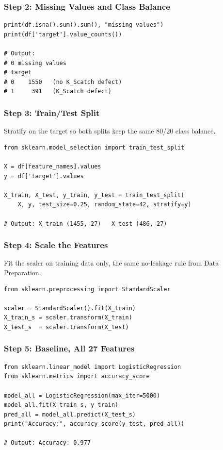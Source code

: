 \begin{frame}[fragile]\frametitle{Step 2: Missing Values and Class Balance}
\begin{lstlisting}
print(df.isna().sum().sum(), "missing values")
print(df['target'].value_counts())

# Output:
# 0 missing values
# target
# 0    1550   (no K_Scatch defect)
# 1     391   (K_Scatch defect)
\end{lstlisting}
\end{frame}

\begin{frame}[fragile]\frametitle{Step 3: Train/Test Split}
Stratify on the target so both splits keep the same 80/20 class balance.
\begin{lstlisting}
from sklearn.model_selection import train_test_split

X = df[feature_names].values
y = df['target'].values

X_train, X_test, y_train, y_test = train_test_split(
    X, y, test_size=0.25, random_state=42, stratify=y)

# Output: X_train (1455, 27)   X_test (486, 27)
\end{lstlisting}
\end{frame}

\begin{frame}[fragile]\frametitle{Step 4: Scale the Features}
Fit the scaler on training data only, the same no-leakage rule from Data Preparation.
\begin{lstlisting}
from sklearn.preprocessing import StandardScaler

scaler = StandardScaler().fit(X_train)
X_train_s = scaler.transform(X_train)
X_test_s  = scaler.transform(X_test)
\end{lstlisting}
\end{frame}

\begin{frame}[fragile]\frametitle{Step 5: Baseline, All 27 Features}
\begin{lstlisting}
from sklearn.linear_model import LogisticRegression
from sklearn.metrics import accuracy_score

model_all = LogisticRegression(max_iter=5000)
model_all.fit(X_train_s, y_train)
pred_all = model_all.predict(X_test_s)
print("Accuracy:", accuracy_score(y_test, pred_all))

# Output: Accuracy: 0.977
\end{lstlisting}
\end{frame}

